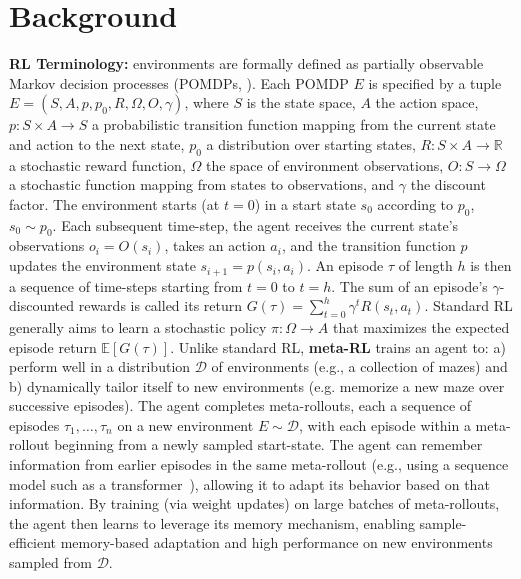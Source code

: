\documentclass{article}
\begin{document}
\section{Background}\label{background}
\textbf{RL Terminology:} environments are formally defined as partially observable Markov decision processes (POMDPs, \cite{sutton_bach_barto_2018}). Each POMDP \(E\) is specified by a tuple \(E = (S, A, p, p_0, R, \Omega, O, \gamma)\), where \(S\) is the state space, \(A\) the action space, \(p : S \times A \to S\) a probabilistic transition function mapping from the current state and action to the next state, \(p_0\) a distribution over starting states, \(R : S \times A \to \mathbb{R}\) a stochastic reward function, \(\Omega\) the space of environment observations, \(O : S \to \Omega\) a stochastic function mapping from states to observations, and \(\gamma\) the discount factor. The environment starts (at \(t=0\)) in a start state \(s_0\) according to \(p_0\), \(s_0 \sim p_0\). Each subsequent time-step, the agent receives the current state's observations \(o_i = O(s_i)\), takes an action \(a_i\), and the transition function \(p\) updates the environment state \(s_{i+1} = p(s_i, a_i)\). An episode \(\tau\) of length \(h\) is then a sequence of time-steps starting from \(t=0\) to \(t=h\). The sum of an episode's \(\gamma\)-discounted rewards is called its return \(G(\tau) = \sum_{t=0}^{h}\gamma^t R(s_t, a_t)\). Standard RL generally aims to learn a stochastic policy \(\pi : \Omega \to A\) that maximizes the expected episode return \(\mathbb{E}\left[G(\tau)\right]\).
Unlike standard RL, \textbf{meta-RL} trains an agent to: a) perform well in a distribution \(\mathcal{D}\) of environments (e.g., a collection of mazes) and b)
dynamically tailor itself to new environments (e.g. memorize a new maze over successive episodes).
The agent completes meta-rollouts, each a sequence of episodes \(\tau_1, \dots, \tau_n\) on a new environment \(E \sim \mathcal{D}\), with each episode within a meta-rollout beginning from a newly sampled start-state. The agent can remember information from earlier episodes in the same meta-rollout (e.g., using a sequence model such as a transformer~\citep{radford2019language}), allowing it to adapt its behavior based on that information.
By training (via weight updates) on large batches of meta-rollouts, the agent then learns to leverage its memory mechanism, enabling sample-efficient memory-based adaptation and high performance on new environments sampled from \(\mathcal{D}\).
\end{document}
